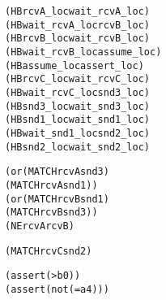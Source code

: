 \newsavebox{\boxSMT}
\begin{lrbox}{\boxSMT}
\begin{minipage}[c]{0.4\linewidth}
\begin{alltt}
(HB rcvA_loc wait_rcvA_loc)
(HB wait_rcvA_loc rcvB_loc)
(HB rcvB_loc wait_rcvB_loc)
(HB wait_rcvB_loc assume_loc)
(HB assume_loc assert_loc)
(HB rcvC_loc wait_rcvC_loc)
(HB wait_rcvC_loc snd3_loc)
(HB snd3_loc wait_snd3_loc)
(HB snd1_loc wait_snd1_loc)
(HB wait_snd1_loc snd2_loc)
(HB snd2_loc wait_snd2_loc)

(or (MATCH rcvA snd3)
    (MATCH rcvA snd1))
(or (MATCH rcvB  snd1)
    (MATCH rcvB snd3))
(NE rcvA rcvB)

(MATCH rcvC snd2)

(assert (> b 0))
(assert (not (= a 4)))
\end{alltt}
\end{minipage}
\end{lrbox}

\newcommand\examplefigone{
\begin{figure*}[t]
\begin{center}
\setlength{\tabcolsep}{2pt}
\begin{tabular}[t]{c|c|c}
P0 & P1 & P2 \\
\hline
\scalebox{0.8}{\usebox{\boxTZero}}&
\scalebox{0.8}{\usebox{\boxTOne}} &
\scalebox{0.8}{\usebox{\boxTTwo}}\\
\end{tabular}
\end{center}
\caption{An MPI concurrent trace program}
\label{fig:mpi}
\end{figure*}
}

\newcommand\examplefigoneB{
\begin{figure*}[t]
\begin{center}
\setlength{\tabcolsep}{2pt}
\begin{tabular}[t]{c|c|c}
P0 & P1 & P2 \\
\hline
\scalebox{0.8}{\usebox{\boxBTZero}}&
\scalebox{0.8}{\usebox{\boxBTOne}} &
\scalebox{0.8}{\usebox{\boxBTTwo}}\\
\end{tabular}
\end{center}
\caption{An MCAPI concurrent trace program with Barriers}
\label{fig:mpi_barrier}
\end{figure*}
}
